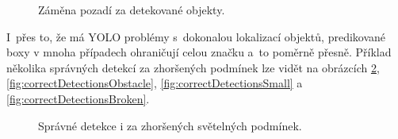 \begin{figure}[H]
    \centering
    \hfill
    \caption{Záměna pozadí za detekované objekty.}
    \label{fig:backgroundDetections}
\end{figure}

 I~přes to, že má YOLO problémy s~dokonalou lokalizací objektů, predikované boxy v mnoha případech ohraničují celou značku a~to poměrně přesně. Příklad několika správných detekcí za zhoršených podmínek lze vidět na obrázcích \ref{fig:correctDetectionsLuminescence}, \ref{fig:correctDetectionsObstacle}, \ref{fig:correctDetectionsSmall} a \ref{fig:correctDetectionsBroken}.
 
\begin{figure}[H]
    \centering
    \hfill
    \caption{Správné detekce i za zhoršených světelných podmínek.}
    \label{fig:correctDetectionsLuminescence}
\end{figure}

